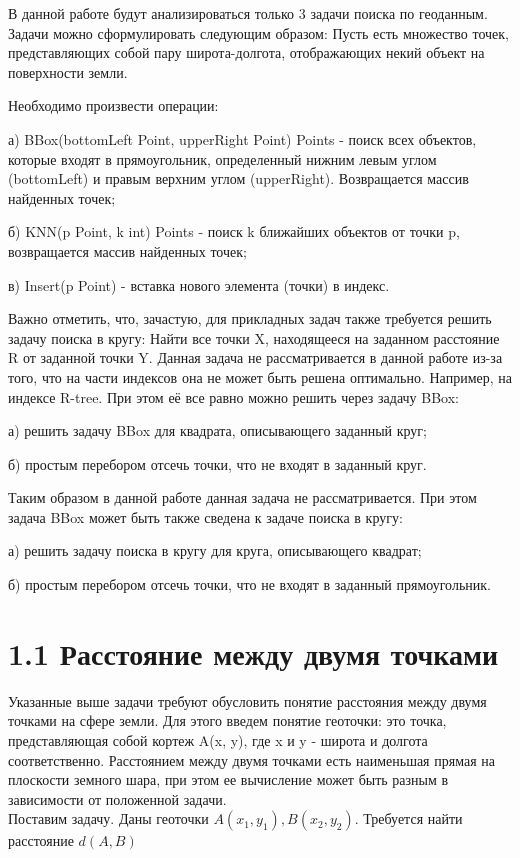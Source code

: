 \label{cha:analysis}

В данной работе будут анализироваться только 3 задачи поиска по геоданным. Задачи можно сформулировать следующим образом:
Пусть есть множество точек, представляющих собой пару широта-долгота, отображающих некий объект на поверхности земли. 

Необходимо произвести операции:
\par а) BBox(bottomLeft Point, upperRight Point) Points - поиск всех объектов, которые входят в прямоугольник, определенный нижним левым углом (bottomLeft) и правым верхним углом (upperRight). Возвращается массив найденных точек;
\par б) KNN(p Point, k int) Points - поиск k ближайших объектов от точки p, возвращается массив найденных точек;
\par в) Insert(p Point) - вставка нового элемента (точки) в индекс. 

Важно отметить, что, зачастую, для прикладных задач также требуется решить задачу поиска в кругу: Найти все точки X, находящееся на заданном расстояние R от заданной точки Y. Данная задача не рассматривается в данной работе из-за того, что на части индексов она не может быть решена оптимально. Например, на индексе R-tree. При этом её все равно можно решить через задачу BBox: 
\par а) решить задачу BBox для квадрата, описывающего заданный круг;
\par б) простым перебором отсечь точки, что не входят в заданный круг.

Таким образом в данной работе данная задача не рассматривается. При этом задача BBox может быть также сведена к задаче поиска в кругу:
\par а) решить задачу поиска в кругу для круга, описывающего квадрат;
\par б) простым перебором отсечь точки, что не входят в заданный прямоугольник.

\section{1.1 Расстояние между двумя точками}
Указанные выше задачи требуют обусловить понятие расстояния между двумя точками на сфере земли. Для этого введем понятие геоточки: это точка, представляющая собой кортеж A(x, y), где x и y - широта и долгота соответственно. 
Расстоянием между двумя точками есть наименьшая прямая на плоскости земного шара, при этом ее вычисление может быть разным в зависимости от положенной задачи. \\
Поставим задачу. Даны геоточки $A(x_1, y_1), B(x_2, y_2)$. Требуется найти расстояние $d(A, B)$

